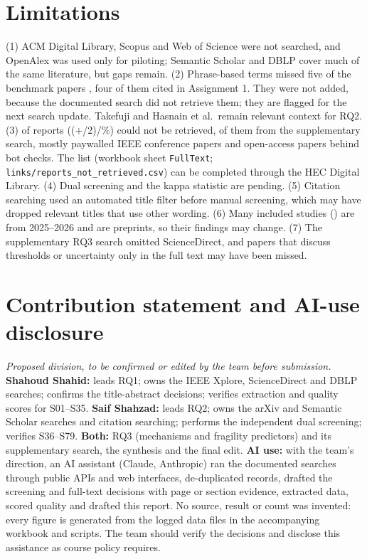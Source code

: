 \section{Limitations}\label{sec:lim}
(1) ACM Digital Library, Scopus and Web of Science were not searched, and OpenAlex was used only for piloting; Semantic Scholar and DBLP cover much of the same literature, but gaps remain. (2) Phrase-based terms missed five of the \nKnown{} benchmark papers \cite{hwang2025,decker2025,lin2023,takefuji2025,hasnain2026}, four of them cited in Assignment 1. They were not added, because the documented search did not retrieve them; they are flagged for the next search update. Takefuji and Hasnain et al.\ remain relevant context for RQ2. (3) \totalNotRetrieved{} of \totalSought{} reports (\the\numexpr(+\totalSought/2)/\totalSought\relax\%) could not be retrieved, \spNotRetrieved{} of them from the supplementary search, mostly paywalled IEEE conference papers and open-access papers behind bot checks. The list (workbook sheet \texttt{FullText}; \texttt{links/reports\_not\_retrieved.csv}) can be completed through the HEC Digital Library. (4) Dual screening and the kappa statistic are pending. (5) Citation searching used an automated title filter before manual screening, which may have dropped relevant titles that use other wording. (6) Many included studies (\incSinceTwentyFive{}) are from 2025--2026 and \incPreprint{} are preprints, so their findings may change. (7) The supplementary RQ3 search omitted ScienceDirect, and papers that discuss thresholds or uncertainty only in the full text may have been missed.

\section{Contribution statement and AI-use disclosure}\label{sec:contrib}
\textit{Proposed division, to be confirmed or edited by the team before submission.} \textbf{Shahoud Shahid:} leads RQ1; owns the IEEE Xplore, ScienceDirect and DBLP searches; confirms the title-abstract decisions; verifies extraction and quality scores for S01--S35. \textbf{Saif Shahzad:} leads RQ2; owns the arXiv and Semantic Scholar searches and citation searching; performs the independent dual screening; verifies S36--S79. \textbf{Both:} RQ3 (mechanisms and fragility predictors) and its supplementary search, the synthesis and the final edit. \textbf{AI use:} with the team's direction, an AI assistant (Claude, Anthropic) ran the documented searches through public APIs and web interfaces, de-duplicated records, drafted the screening and full-text decisions with page or section evidence, extracted data, scored quality and drafted this report. No source, result or count was invented: every figure is generated from the logged data files in the accompanying workbook and scripts. The team should verify the decisions and disclose this assistance as course policy requires.

